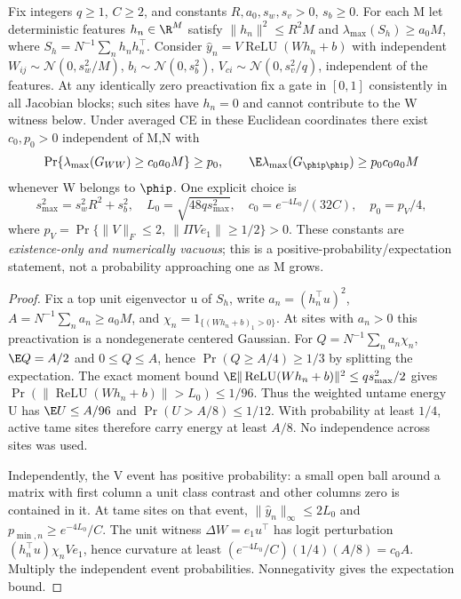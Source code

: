 \begin{theorem}
\label{thm:astra_interior_relu}
Fix integers $q\ge1$, $C\ge2$, and constants $R,a_0,s_w,s_v>0$,
$s_b\ge0$. For each M let deterministic features $h_n\in\R^M$ satisfy
$\|h_n\|^2\le R^2M$ and
$\lambda_{\max}(S_h)\ge a_0M$, where
$S_h=N^{-1}\sum_nh_nh_n^\top$.
Consider $\hat y_n=V\operatorname{ReLU}(Wh_n+b)$ with independent
$W_{ij}\sim\mathcal N(0,s_w^2/M)$, $b_i\sim\mathcal N(0,s_b^2)$,
$V_{ci}\sim\mathcal N(0,s_v^2/q)$, independent of the features.
At any identically zero preactivation fix a gate in $[0,1]$ consistently
in all Jacobian blocks; such sites have $h_n=0$ and cannot contribute
to the W witness below. Under averaged CE in these Euclidean
coordinates there exist $c_0,p_0>0$
independent of M,N with
\[
 \Pr\{\lambda_{\max}(G_{WW})\ge c_0a_0M\}\ge p_0,
 \qquad \E\lambda_{\max}(G_{\phip\phip})\ge p_0c_0a_0M
\]
whenever W belongs to $\phip$.
One explicit choice is
\[
 s_{\max}^2=s_w^2R^2+s_b^2,\quad L_0=\sqrt{48q s_{\max}^2},
 \quad c_0=e^{-4L_0}/(32C),\quad p_0=p_V/4,
\]
where $p_V=\Pr\{\|V\|_F\le2,\ \|\Pi Ve_1\|\ge1/2\}>0$.
These constants are \emph{existence-only and numerically vacuous}; this
is a positive-probability/expectation statement, not a probability
approaching one as M grows.
\end{theorem}
\begin{proof}
Fix a top unit eigenvector u of $S_h$, write
$a_n=(h_n^\top u)^2$, $A=N^{-1}\sum_na_n\ge a_0M$, and
$\chi_n=1_{\{(Wh_n+b)_1>0\}}$.
At sites with $a_n>0$ this preactivation is a nondegenerate centered
Gaussian. For $Q=N^{-1}\sum_na_n\chi_n$, $\E Q=A/2$ and $0\le Q\le A$,
hence $\Pr(Q\ge A/4)\ge1/3$ by splitting the expectation.
The exact moment bound
$\E\|\operatorname{ReLU}(Wh_n+b)\|^2\le qs_{\max}^2/2$
gives $\Pr(\|\operatorname{ReLU}(Wh_n+b)\|>L_0)\le1/96$.
Thus the weighted untame energy U has $\E U\le A/96$ and
$\Pr(U>A/8)\le1/12$. With probability at least $1/4$, active tame
sites therefore carry energy at least $A/8$. No independence across
sites was used.

Independently, the V event has positive probability: a small open ball
around a matrix with first column a unit class contrast and other
columns zero is contained in it. At tame sites on that event,
$\|\hat y_n\|_\infty\le2L_0$ and $p_{\min,n}\ge e^{-4L_0}/C$.
The unit witness $\Delta W=e_1u^\top$ has logit perturbation
$(h_n^\top u)\chi_nVe_1$, hence curvature at least
$(e^{-4L_0}/C)(1/4)(A/8)=c_0A$. Multiply the independent event
probabilities. Nonnegativity gives the expectation bound.
\end{proof}
